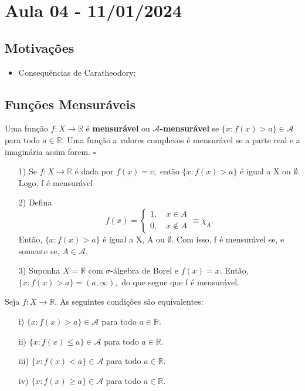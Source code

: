 \documentclass[measure_theory.tex]{subfiles}
\begin{document}
\section{Aula 04 - 11/01/2024}
\subsection{Motivações}
\begin{itemize}
	\item Consequências de Caratheodory;
\end{itemize}
\subsection{Funções Mensuráveis}
\begin{def*}
	Uma função \(f:X\rightarrow \mathbb{R}\) é \textbf{mensurável} ou \(\mathcal{A}\)\textbf{-mensurável} se \(\{x: f(x) > a\}\in \mathcal{A}\) para todo \(a\in \mathbb{R}.\) Uma função
	a valores complexos é mensurável se a parte real e a imaginária assim forem. \(\square\)
\end{def*}
\begin{example}
	\begin{itemize}
		\item[1)] Se \(f:X\rightarrow \mathbb{R}\) é dada por \(f(x) = c,\) então \(\{x: f(x) > a\}\) é igual a X ou \(\emptyset .\) Logo, f é mensurável
		\item[2)] Defina
		      \[
			      f(x)  = \left\{\begin{array}{ll}
				      1,\quad x\in A \\
				      0,\quad x\not\in A
			      \end{array}\right.\equiv \chi_{A}.
		      \]
		      Então, \(\{x: f(x) > a\}\) é igual a X, A ou \(\emptyset .\) Com isso, f é mensurável se, e somente se, \(A\in \mathcal{A}.\)
		\item[3)] Suponha \(X = \mathbb{R}\) com \(\sigma \)-álgebra de Borel e \(f(x) = x\). Então, \(\{x: f(x) > a\} = (a, \infty),\) do que
		      segue que f é mensurável.
	\end{itemize}
\end{example}
\begin{prop*}
	Seja \(f:X\rightarrow \mathbb{R}.\) As seguintes condições são equivalentes:
	\begin{itemize}
		\item[i)] \(\{x: f(x) > a\}\in \mathcal{A}\) para todo \(a\in \mathbb{R}.\)
		\item[ii)] \(\{x: f(x) \leq  a\}\in \mathcal{A}\) para todo \(a\in \mathbb{R}.\)
		\item[iii)] \(\{x: f(x) < a\}\in \mathcal{A}\) para todo \(a\in \mathbb{R}.\)
		\item[iv)] \(\{x: f(x) \geq  a\}\in \mathcal{A}\) para todo \(a\in \mathbb{R}.\)
	\end{itemize}
\end{prop*}
\end{document}
